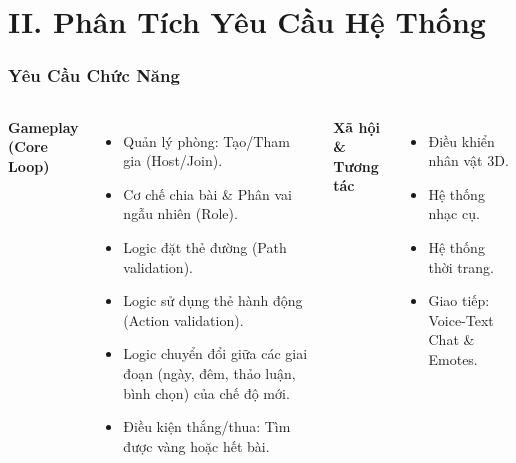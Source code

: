 \section{II. Phân Tích Yêu Cầu Hệ Thống}

\begin{frame}
\frametitle{Yêu Cầu Chức Năng}
\begin{columns}
    \textbf{Gameplay (Core Loop)}
    \begin{itemize}
        \item Quản lý phòng: Tạo/Tham gia (Host/Join).
        \item Cơ chế chia bài \& Phân vai ngẫu nhiên (Role).
        \item Logic đặt thẻ đường (Path validation).
        \item Logic sử dụng thẻ hành động (Action validation).
        \item Logic chuyển đổi giữa các giai đoạn (ngày, đêm, thảo luận, bình chọn) của chế độ mới.
        \item Điều kiện thắng/thua: Tìm được vàng hoặc hết bài.
    \end{itemize}
    \textbf{Xã hội \& Tương tác}
    \begin{itemize}
        \item Điều khiển nhân vật 3D.
        \item Hệ thống nhạc cụ.
        \item Hệ thống thời trang.
        \item Giao tiếp: Voice-Text Chat \& Emotes.
    \end{itemize}
\end{columns}
\end{frame}

